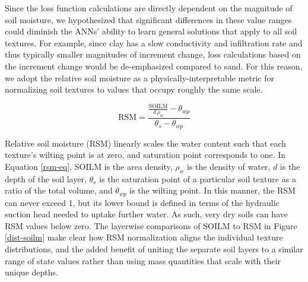 Since the loss function calculations are directly dependent on the magnitude of soil moisture, we hypothesized that significant differences in these value ranges could diminish the ANNs' ability to learn general solutions that apply to all soil textures. For example, since clay has a slow conductivity and infiltration rate and thus typically smaller magnitudes of increment change, loss calculations based on the increment change would be de-emphasized compared to sand. For this reason, we adopt the relative soil moisture as a physically-interpretable metric for normalizing soil textures to values that occupy roughly the same scale.

\begin{equation}\label{rsm-eq}
    \text{RSM} = \frac{\frac{\text{SOILM}}{d \, \rho_w} - \theta_{wp}}{\theta_s - \theta_{wp}}
\end{equation}

Relative soil moisture (RSM) linearly scales the water content such that each texture's wilting point is at zero, and saturation point corresponds to one. In Equation \ref{rsm-eq}, SOILM is the area density, $\rho_w$ is the density of water, $d$ is the depth of the soil layer, $\theta_s$ is the saturation point of a particular soil texture as a ratio of the total volume, and $\theta_{wp}$ is the wilting point. In this manner, the RSM can never exceed 1, but its lower bound is defined in terms of the hydraulic suction head needed to uptake further water. As such, very dry soils can have RSM values below zero. The layerwise comparisons of SOILM to RSM in Figure \ref{dist-soilm} make clear how RSM normalization aligns the individual texture distributions, and the added benefit of uniting the separate soil layers to a similar range of state values rather than using mass quantities that scale with their unique depths.

